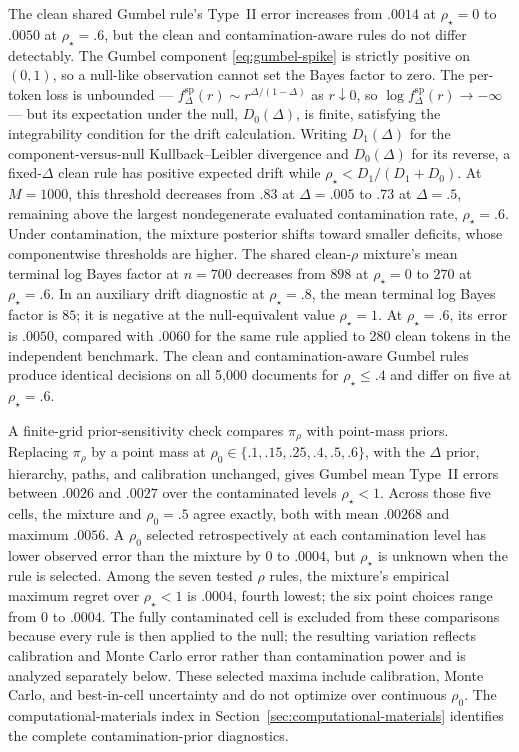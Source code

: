 \documentclass[11pt]{article}
\begin{document}
The clean shared Gumbel rule's Type~II error increases from $.0014$ at $\rho_\star=0$ to $.0050$ at $\rho_\star=.6$, but the clean and contamination-aware rules do not differ detectably.  The Gumbel component \eqref{eq:gumbel-spike} is strictly positive on $(0,1)$, so a null-like observation cannot set the Bayes factor to zero.  The per-token loss is unbounded --- $f^{\mathrm{sp}}_\Delta(r)\sim r^{\Delta/(1-\Delta)}$ as $r\downarrow0$, so $\log f^{\mathrm{sp}}_\Delta(r)\to-\infty$ --- but its expectation under the null, $D_0(\Delta)$, is finite, satisfying the integrability condition for the drift calculation.  Writing $D_1(\Delta)$ for the component-versus-null Kullback--Leibler divergence and $D_0(\Delta)$ for its reverse, a fixed-$\Delta$ clean rule has positive expected drift while $\rho_\star<D_1/(D_1+D_0)$.  At $M=1000$, this threshold decreases from $.83$ at $\Delta=.005$ to $.73$ at $\Delta=.5$, remaining above the largest nondegenerate evaluated contamination rate, $\rho_\star=.6$.  Under contamination, the mixture posterior shifts toward smaller deficits, whose componentwise thresholds are higher.  The shared clean-$\rho$ mixture's mean terminal log Bayes factor at $n=700$ decreases from $898$ at $\rho_\star=0$ to $270$ at $\rho_\star=.6$.  In an auxiliary drift diagnostic at $\rho_\star=.8$, the mean terminal log Bayes factor is $85$; it is negative at the null-equivalent value $\rho_\star=1$.  At $\rho_\star=.6$, its error is $.0050$, compared with $.0060$ for the same rule applied to 280 clean tokens in the independent benchmark.  The clean and contamination-aware Gumbel rules produce identical decisions on all 5,000 documents for $\rho_\star\le.4$ and differ on five at $\rho_\star=.6$.

A finite-grid prior-sensitivity check compares $\pi_\rho$ with point-mass priors.  Replacing $\pi_\rho$ by a point mass at $\rho_0\in\{.1,.15,.25,.4,.5,.6\}$, with the $\Delta$ prior, hierarchy, paths, and calibration unchanged, gives Gumbel mean Type~II errors between $.0026$ and $.0027$ over the contaminated levels $\rho_\star<1$.  Across those five cells, the mixture and $\rho_0=.5$ agree exactly, both with mean $.00268$ and maximum $.0056$.  A $\rho_0$ selected retrospectively at each contamination level has lower observed error than the mixture by $0$ to $.0004$, but $\rho_\star$ is unknown when the rule is selected.  Among the seven tested $\rho$ rules, the mixture's empirical maximum regret over $\rho_\star<1$ is $.0004$, fourth lowest; the six point choices range from $0$ to $.0004$.  The fully contaminated cell is excluded from these comparisons because every rule is then applied to the null; the resulting variation reflects calibration and Monte Carlo error rather than contamination power and is analyzed separately below.  These selected maxima include calibration, Monte Carlo, and best-in-cell uncertainty and do not optimize over continuous $\rho_0$.  The computational-materials index in Section~\ref{sec:computational-materials} identifies the complete contamination-prior diagnostics.
\end{document}
